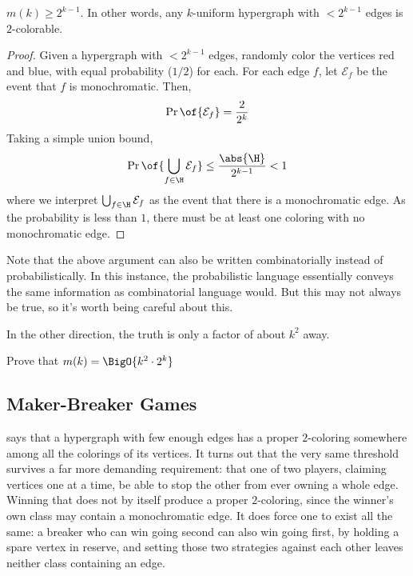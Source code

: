 \begin{boxtheorem}\label{Ch2:Thm:mk_Lower_Bound}
    $m(k) \geq 2^{k - 1}$. In other words, any $k$-uniform hypergraph with $< 2^{k - 1}$ edges is $2$-colorable.
\end{boxtheorem}
\begin{proof}
    Given a hypergraph with $< 2^{k-1}$ edges, randomly color the vertices red and blue, with equal probability ($1/2$) for each. For each edge $f$, let $\mathcal{E}_f$ be the event that $f$ is monochromatic. Then,
    \begin{align*}
        \Pr\of{\mathcal{E}_f} = \frac{2}{2^k}
    \end{align*}
    Taking a simple union bound,
    \begin{align*}
        \Pr\of{\bigcup_{f \in \H} \mathcal{E}_f} \leq \frac{\abs{\H}}{2^{k - 1}} < 1
    \end{align*}
    where we interpret $\bigcup_{f \in \H} \mathcal{E}_f$ as the event that there is a monochromatic edge. As the probability is less than $1$, there must be at least one coloring with no monochromatic edge.
\end{proof}

Note that the above argument can also be written combinatorially instead of probabilistically. In this instance, the probabilistic language essentially conveys the same information as combinatorial language would. But this may not always be true, so it's worth being careful about this.

In the other direction, the truth is only a factor of about $k^2$ away.

\begin{boxexercise}
    Prove that $m(k) = \BigO{k^2 \cdot 2^k}$
\end{boxexercise}

\subsection{Maker-Breaker Games}

 says that a hypergraph with few enough edges has a proper $2$-coloring somewhere among all the colorings of its vertices. It turns out that the very same threshold survives a far more demanding requirement: that one of two players, claiming vertices one at a time, be able to stop the other from ever owning a whole edge. Winning that does not by itself produce a proper $2$-coloring, since the winner's own class may contain a monochromatic edge. It does force one to exist all the same: a breaker who can win going second can also win going first, by holding a spare vertex in reserve, and setting those two strategies against each other leaves neither class containing an edge.


